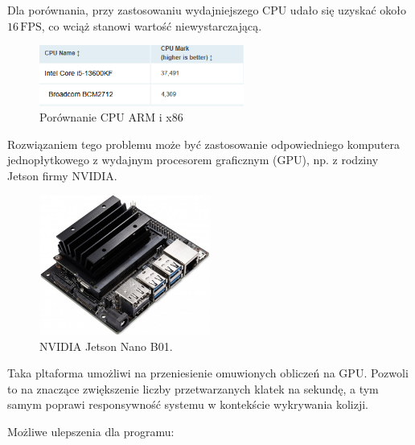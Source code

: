 \documentclass[magisterska]{pracadypl}
\begin{document}
Dla porównania, przy zastosowaniu wydajniejszego CPU udało się uzyskać około $16\,\text{FPS}$, co wciąż stanowi wartość niewystarczającą.

\begin{figure}[H]  %
    \centering  %
    \includegraphics[width=0.6\textwidth]{images/cpu-compare.png}  %
    \captionsetup{font=footnotesize}
    \caption[Porównanie CPU ARM i x86. https://www.cpubenchmark.net/]{Porównanie CPU ARM i x86}
\end{figure}

Rozwiązaniem tego problemu może być zastosowanie odpowiedniego komputera jednopłytkowego z wydajnym procesorem graficznym (GPU), np. z rodziny Jetson firmy NVIDIA.

\begin{figure}[H]  %
    \centering  %
    \includegraphics[width=0.5\textwidth]{images/jetson.png}  %
    \captionsetup{font=footnotesize}
    \caption[NVIDIA Jetson Nano B01. https://kamami.pl/wycofane-z-oferty/574587-zestaw-deweloperski-nvidia-jetson-nano.html]{NVIDIA Jetson Nano B01.}
\end{figure}

Taka pltaforma umożliwi na przeniesienie omuwionych obliczeń na GPU. Pozwoli to na znaczące zwiększenie liczby przetwarzanych klatek na sekundę, a tym samym poprawi responsywność systemu w kontekście wykrywania kolizji.

Możliwe ulepszenia dla programu:
\end{document}
